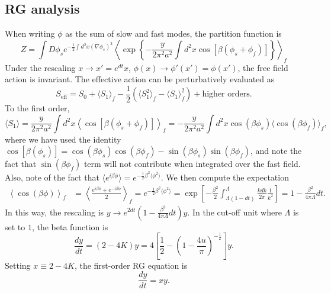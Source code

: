 \documentclass{SciPost}
\begin{document}
\subsection{RG analysis}
When writing $\phi$ as the sum of slow and fast modes, the partition function is
\begin{equation*}
	Z = \int D\phi_s e^{-\frac{1}{2}\int d^2x (\nabla\phi_s)^2}
	\left\langle\exp\left\{-\frac{y}{2\pi^2 a^2} \int d^2 x \cos\left[\beta(\phi_s+\phi_f)\right] \right\}\right\rangle_f
\end{equation*}
Under the rescaling $x \rightarrow x' = e^{dt} x$, $\phi(x) \rightarrow \phi'(x') = \phi(x')$, the free field action is invariant.
The effective action can be perturbatively evaluated as
\begin{equation*}
	S_{\mathrm{eff}} = S_0 + \langle S_1\rangle_f - \frac{1}{2}(\langle S_1^2\rangle_f - \langle S_1\rangle_f^2) + \text{higher orders}.
\end{equation*}
To the first order, 
\begin{equation*}
	\langle S_1\rangle = \frac{y}{2\pi^2 a^2} \int d^2 x \left\langle\cos\left[\beta(\phi_s+\phi_f)\right] \right\rangle_f 
	= -\frac{y}{2\pi^2 a^2} \int d^2 x \cos(\beta\phi_s)\langle\cos(\beta\phi_f)\rangle_f,
\end{equation*}
where we have used the identity $\cos\left[\beta(\phi_s)\right] = \cos(\beta\phi_s)\cos(\beta\phi_f)-\sin(\beta\phi_s)\sin(\beta\phi_f)$,
and note the fact that $\sin(\beta\phi_f)$ term will not contribute when integrated over the fast field. 
Also, note of the fact that $\langle e^{i\beta\phi}\rangle = e^{-\frac{1}{2}\beta^2 \langle\phi^2\rangle}$.
We then compute the expectation
\begin{equation*}
\begin{aligned}
	\left\langle \cos(\beta\phi)\right\rangle_f
	&= \left\langle \frac{e^{i\beta\phi} + e^{-i\beta\phi}}{2}\right\rangle_f
	= e^{-\frac{1}{2}\beta^2\langle\phi^2\rangle} 
	= \exp\left[-\frac{\beta^2}{2}\int^\Lambda_{\Lambda(1-dt)}\frac{k dk}{2\pi} \frac{1}{k^2} \right] 
	= 1-\frac{\beta^2}{4\pi\Lambda}dt.
\end{aligned}
\end{equation*}
In this way, the rescaling is $y \rightarrow e^{2dt}\left(1-\frac{\beta^2}{4\pi\Lambda}dt\right) y$.
In the cut-off unit where $\Lambda$ is set to $1$, the beta function is
\begin{equation*}
	\frac{dy}{dt} = (2-4K) y = 4\left[\frac{1}{2}-\left(1-\frac{4u}{\pi}\right)^{-\frac{1}{2}}\right]y.
\end{equation*}
Setting $x\equiv 2-4K$, the first-order RG equation is
\begin{equation}
	\frac{dy}{dt} = xy.
\end{equation}
\end{document}
